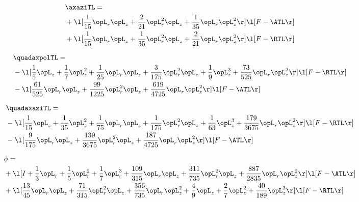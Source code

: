 \begin{alignat}{2} 
\label{eq:linaxaziTL_3} 
& \axaziTL = \\ 
& + \l[ \frac{1}{15} \opL_r \opL_z + \frac{2}{21} \opL_r^{2} \opL_z + \frac{1}{35} \opL_r \opL_z^{2}  \r] \l[ F - \ATL \r] \nonumber \\ 
& + \l[ \frac{1}{15} \opL_r \opL_z + \frac{1}{35} \opL_r^{2} \opL_z + \frac{2}{21} \opL_r \opL_z^{2}  \r] \l[ F - \RTL \r] \nonumber \\ 
\end{alignat} 


\begin{alignat}{2} 
\label{eq:quadaxpolTL_3} 
& \quadaxpolTL = \\ 
& - \l[ \frac{1}{5} \opL_z + \frac{1}{7} \opL_z^{2} + \frac{1}{25} \opL_r \opL_z + \frac{3}{175} \opL_r^{2} \opL_z + \frac{1}{9} \opL_z^{3} + \frac{73}{525} \opL_r \opL_z^{2}  \r] \l[ F - \RTL \r] \nonumber \\ 
& - \l[ \frac{61}{525} \opL_r \opL_z + \frac{99}{1225} \opL_r^{2} \opL_z + \frac{619}{4725} \opL_r \opL_z^{2}  \r] \l[ F - \ATL \r] \nonumber \\ 
\end{alignat} 


\begin{alignat}{2} 
\label{eq:quadaxaziTL_2} 
& \quadaxaziTL = \\ 
& - \l[ \frac{1}{15} \opL_z + \frac{1}{35} \opL_z^{2} + \frac{1}{75} \opL_r \opL_z + \frac{1}{175} \opL_r^{2} \opL_z + \frac{1}{63} \opL_z^{3} + \frac{179}{3675} \opL_r \opL_z^{2}  \r] \l[ F - \RTL \r] \nonumber \\ 
& - \l[ \frac{9}{175} \opL_r \opL_z + \frac{139}{3675} \opL_r^{2} \opL_z + \frac{187}{4725} \opL_r \opL_z^{2}  \r] \l[ F - \ATL \r] \nonumber \\ 
\end{alignat} 


\begin{alignat}{2} 
\label{eq:scalarFlux_2} 
& \phi = \\ 
& + \l[ I + \frac{1}{3} \opL_r + \frac{1}{5} \opL_r^{2} + \frac{1}{7} \opL_r^{3} + \frac{109}{315} \opL_r \opL_z + \frac{311}{735} \opL_r^{2} \opL_z + \frac{887}{2835} \opL_r \opL_z^{2}  \r] \l[ F - \ATL \r] \nonumber \\ 
& + \l[ \frac{13}{45} \opL_r \opL_z + \frac{71}{315} \opL_r^{2} \opL_z + \frac{356}{735} \opL_r \opL_z^{2} + \frac{4}{9} \opL_z + \frac{2}{7} \opL_z^{2} + \frac{40}{189} \opL_z^{3}  \r] \l[ F - \RTL \r] \nonumber \\ 
\end{alignat} 


